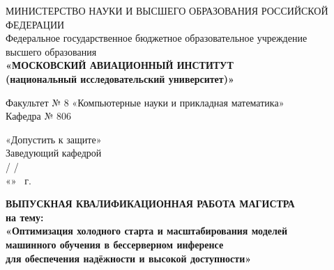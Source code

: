 \thispagestyle{empty}

\begin{center}
{\fontsize{12pt}{14pt}\selectfont
МИНИСТЕРСТВО НАУКИ И ВЫСШЕГО ОБРАЗОВАНИЯ РОССИЙСКОЙ ФЕДЕРАЦИИ\\[4pt]
Федеральное государственное бюджетное образовательное учреждение\\
высшего образования\\[4pt]
\textbf{«МОСКОВСКИЙ АВИАЦИОННЫЙ ИНСТИТУТ\\
(национальный исследовательский университет)»}
}
\end{center}

\vspace{10mm}

\begin{center}
{\fontsize{12pt}{14pt}\selectfont
Факультет № 8 «Компьютерные науки и прикладная математика»\\[4pt]
Кафедра № 806
}
\end{center}

\vspace{8mm}

\begin{flushright}
{\fontsize{12pt}{14pt}\selectfont
«Допустить к защите»\\[4pt]
Заведующий кафедрой\\[4pt]
\underline{\hspace{40mm}} / \underline{\hspace{40mm}} /\\[4pt]
«\underline{\hspace{10mm}}» \underline{\hspace{30mm}} \the\year\ г.
}
\end{flushright}

\vspace{12mm}

\begin{center}
{\fontsize{14pt}{18pt}\selectfont\bfseries
ВЫПУСКНАЯ КВАЛИФИКАЦИОННАЯ РАБОТА МАГИСТРА\\[8pt]
}
{\fontsize{13pt}{16pt}\selectfont\bfseries
на тему:\\[6pt]
«Оптимизация холодного старта и масштабирования моделей\\
машинного обучения в бессерверном инференсе\\
для обеспечения надёжности и высокой доступности»
}
\end{center}

